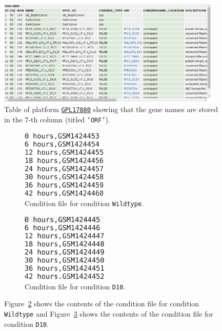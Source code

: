 \documentclass[final,letterpaper,12pt]{article}
\begin{document}
\begin{figure}
	\centering
	\includegraphics[width=0.95\textwidth]{GPLexample}
	\caption{Table of platform \href{https://www.ncbi.nlm.nih.gov/geo/query/acc.cgi?acc=GPL17880}{\texttt{GPL17880}} showing that the gene names are stored in the $7$-th column (titled \texttt{`ORF'}).}
	\label{fig:GPLexample}
\end{figure}

\begin{figure}
    \centering
    \begin{subfigure}{0.5\textwidth}
        \centering
	\includegraphics[width=0.45\textwidth]{condfilex1}
        \caption{Condition file for condition \texttt{Wildtype}.}
        \label{fig:condfilex1}
    \end{subfigure} 
    
    \begin{subfigure}{0.5\textwidth}
        \centering
	\includegraphics[width=0.45\textwidth]{condfilex2}
        \caption{Condition file for condition \texttt{D10}.}
                \label{fig:condfilex2}
    \end{subfigure}
    \caption{Figure~\ref{fig:condfilex1} shows the contents of the condition file for condition \texttt{Wildtype} and Figure~\ref{fig:condfilex2} shows the contents of the condition file for condition \texttt{D10}.}
    \label{fig:condfilesexample}
\end{figure}
\end{document}

